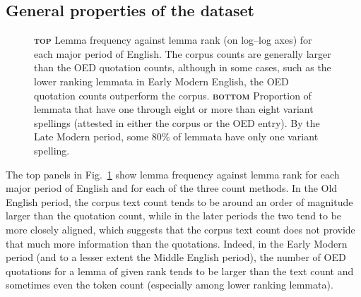 \documentclass[doc,biblatex]{apa7}
\begin{document}
\subsection{General properties of the dataset}

	\begin{figure}
	\vspace*{2pt}
	\caption{\textbf{\textsc{top}} Lemma frequency against lemma rank (on log--log axes) for each major period of English. The corpus counts are generally larger than the OED quotation counts, although in some cases, such as the lower ranking lemmata in Early Modern English, the OED quotation counts outperform the corpus. \textbf{\textsc{bottom}} Proportion of lemmata that have one through eight or more than eight variant spellings (attested in either the corpus or the OED entry). By the Late Modern period, some 80\% of lemmata have only one variant spelling.}
	\label{frequency_plot}
	\end{figure}

The top panels in Fig.~\ref{frequency_plot} show lemma frequency against lemma rank for each major period of English and for each of the three count methods. In the Old English period, the corpus text count tends to be around an order of magnitude larger than the quotation count, while in the later periods the two tend to be more closely aligned, which suggests that the corpus text count does not provide that much more information than the quotations. Indeed, in the Early Modern period (and to a lesser extent the Middle English period), the number of OED quotations for a lemma of given rank tends to be larger than the text count and sometimes even the token count (especially among lower ranking lemmata).
\end{document}
